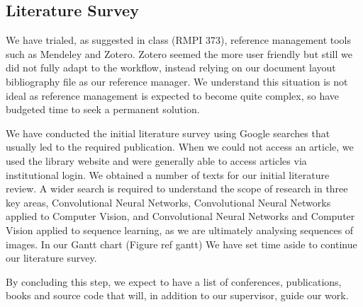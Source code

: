 \subsection{Literature Survey}

We have trialed, as suggested in class (RMPI 373), reference management tools such as Mendeley and Zotero. Zotero seemed the more user friendly but still we did not fully adapt to the workflow, instead relying on our document layout bibliography file as our reference manager. We understand this situation is not ideal as reference management is expected to become quite complex, so have budgeted time to seek a permanent solution.  

We have conducted the initial literature survey using Google searches that usually led to the required publication. When we could not access an article, we used the library website and were generally able to access articles via institutional login. We obtained a number of texts for our initial literature review. A wider search is required to understand the scope of research in three key areas, Convolutional Neural Networks, Convolutional Neural Networks applied to Computer Vision, and Convolutional Neural Networks and Computer Vision applied to sequence learning, as we are ultimately analysing sequences of images. In our Gantt chart (Figure ref gantt) We have set time aside to continue our literature survey.  

By concluding this step, we expect to have a list of conferences, publications, books and source code that will, in addition to our supervisor, guide our work.